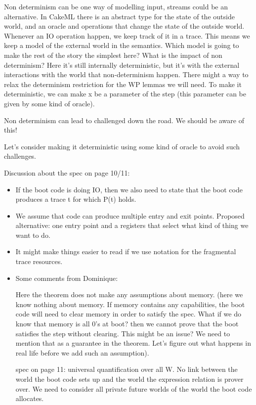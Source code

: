 \documentclass[a4paper, 10pt]{article}
\begin{document}
\begin{itemize}
\begin{itemize}
Non determinism can be one way of modelling input, streams could be an alternative. In CakeML there is an abstract type for the state of the outside world, and an oracle and operations that change the state of the outside world. Whenever an IO operation happen, we keep track of it in a trace. This means we keep a model of the external world in the semantics. 
Which model is going to make the rest of the story the simplest here? 
What is the impact of non determinism? Here it’s still internally deterministic, but it’s with the external interactions with the world that non-determinism happen. There might a way to relax the determinism restriction for the WP lemmas we will need. 
To make it deterministic, we can make x be a parameter of the step (this parameter can be given by some kind of oracle). 

Non determinism can lead to challenged down the road. We should be aware of this!

Let’s consider making it deterministic using some kind of oracle to avoid such challenges. 
\end{itemize}

Discussion about the spec on page 10/11: 
\begin{itemize}
\item If the boot code is doing IO, then we also need to state that the boot code produces a trace t for which P(t) holds.
\item We assume that code can produce multiple entry and exit points. Proposed alternative: one entry point and a registers that select what kind of thing we want to do. 
\item It might make things easier to read if we use notation for the fragmental trace resources. 
\item Some comments from Dominique: 

Here the theorem does not make any assumptions about memory. (here we know nothing about memory. If memory contains any capabilities, the boot code will need to clear memory in order to satisfy the spec. What if we do know that memory is all 0’s at boot? then we cannot prove that the boot satisfies the step without clearing. This might be an issue? We need to mention that as a guarantee in the theorem. Let’s figure out what happens in real life before we add such an assumption).

spec on page 11: universal quantification over all W. No link between the world the boot code sets up and the world the expression relation is prover over. We need to consider all private future worlds of the world the boot code allocates. 


\end{itemize}
\end{itemize}
\end{document}
